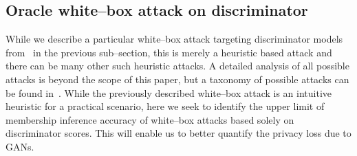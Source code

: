 \documentclass{article}
\begin{document}
\subsection{Oracle white--box attack on discriminator}
While we describe a particular white--box attack targeting discriminator models from~\cite{hayes2019logan} in the previous sub--section, this is merely a heuristic based attack and there can be many other such heuristic attacks. A detailed analysis of all possible attacks is beyond the scope of this paper, but a taxonomy of possible attacks can be found in~\cite{chen2019gan}. While the previously described white--box attack is an intuitive heuristic for a practical scenario, here we seek to identify the upper limit of membership inference accuracy of white--box attacks based solely on discriminator scores. This will enable us to better quantify the privacy loss due to GANs.  
\end{document}
